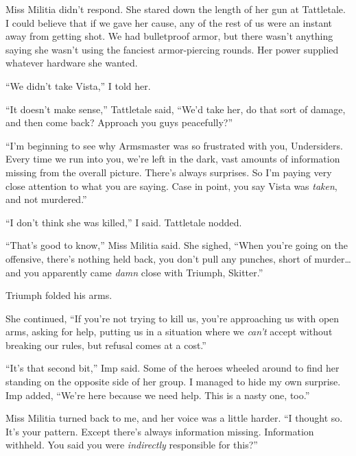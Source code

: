 





Miss Militia didn't respond.  She stared down the length of her gun at Tattletale.  I could believe that if we gave her cause, any of the rest of us were an instant away from getting shot.  We had bulletproof armor, but there wasn't anything saying she wasn't using the fanciest armor-piercing rounds.  Her power supplied whatever hardware she wanted.



``We didn't take Vista,'' I told her.



``It doesn't make sense,'' Tattletale said, ``We'd take her, do that sort of damage, and then come back?  Approach you guys peacefully?''



``I'm beginning to see why Armsmaster was so frustrated with you, Undersiders.  Every time we run into you, we're left in the dark, vast amounts of information missing from the overall picture.  There's always surprises.  So I'm paying very close attention to what you are saying.  Case in point, you say Vista was \emph{taken}, and not murdered.''



``I don't think she was killed,'' I said.  Tattletale nodded.



``That's good to know,'' Miss Militia said.  She sighed, ``When you're going on the offensive, there's nothing held back, you don't pull any punches, short of murder\ldots and you apparently came \emph{damn} close with Triumph, Skitter.''



Triumph folded his arms.



She continued, ``If you're not trying to kill us, you're approaching us with open arms, asking for help, putting us in a situation where we \emph{can't} accept without breaking our rules, but refusal comes at a cost.''



``It's that second bit,'' Imp said.  Some of the heroes wheeled around to find her standing on the opposite side of her group.  I managed to hide my own surprise.  Imp added, ``We're here because we need help.  This is a nasty one, too.''



Miss Militia turned back to me, and her voice was a little harder.  ``I thought so.  It's your pattern.  Except there's always information missing.  Information withheld.  You said you were \emph{indirectly} responsible for this?''




